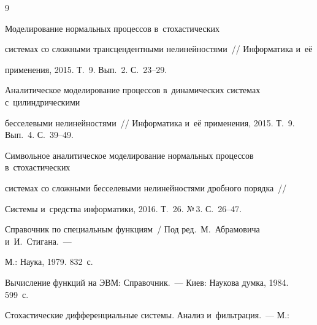 {\small\frenchspacing

{%


\begin{thebibliography}{9}





Моделирование нормальных процессов в~стохастических 

системах со сложными трансцендентными нелинейностями~/\!\!/ Информатика и~её 

применения, 2015. Т.~9. Вып.~2. С.~23--29.





Аналитическое моделирование процессов в~динамических системах с~цилиндрическими 

бесселевыми нелинейностями~/\!\!/ Информатика и~её применения, 2015. Т.~9. Вып.~4. С.~39--49.





Символьное аналитическое моделирование нормальных процессов в~стохастических 

системах со сложными бесселевыми нелинейностями дробного порядка~/\!\!/ 

Системы и~средства информатики, 2016. Т.~26. №\,3. С.~26--47.




Справочник по специальным функциям~/ Под ред.\ М.~Абрамовича и~И.~Стигана.~--- 

М.: Наука, 1979. 832~с.





Вычисление функций на ЭВМ: Справочник.~--- Киев: Наукова думка, 1984. 599~с.





Стохастические дифференциальные системы. Анализ и~фильтрация.~--- М.:


\end{thebibliography}}}
